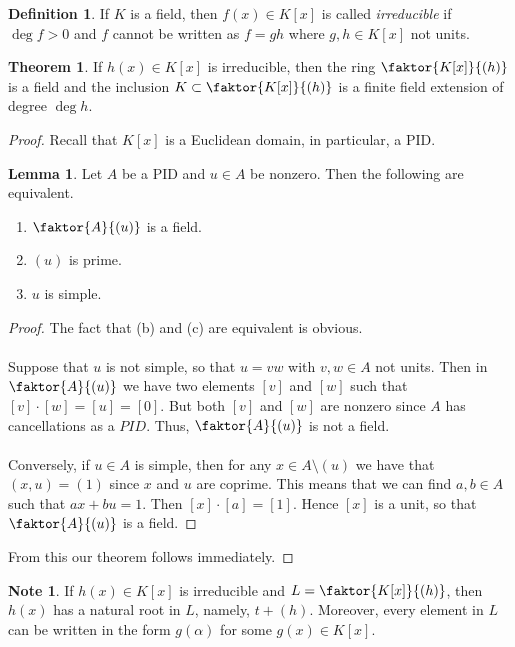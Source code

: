 \documentclass[10pt,letterpaper,cm]{nupset}
\theoremstyle{definition}
\newtheorem*{definition}{Definition}
\newtheorem{note}{Note}
\newtheorem{theorem}{Theorem}
\newtheorem{lemma}{Lemma}
\newcommand{\1}{\mathbf{1}}
\newcommand{\0}{\vec 0}
\begin{document}
\begin{definition}
If $K$ is a field, then $f(x) \in K[x]$ is called \textit{irreducible} if $\deg{f}>0$ and $f$ cannot be written as $f=gh$ where $g,h\in K[x]$ not units. 
\end{definition}

\begin{theorem}
If $h(x) \in K[x]$ is irreducible, then the ring $\faktor{K[x]}{(h)}$ is a field and the inclusion $K \subset \faktor{K[x]}{(h)}$ is a finite field extension of degree $\deg{h}$.
\end{theorem}
\begin{proof}
Recall that $K[x]$ is a Euclidean domain, in particular, a PID.
\begin{lemma}
Let $A$ be a PID and $u\in A$ be nonzero. Then the following are equivalent.
\begin{enumerate}[label=(\alph*)]
\item $\faktor{A}{(u)}$ is a field.
\item $(u)$ is prime.
\item$u$ is simple.
\end{enumerate}
\end{lemma}
\begin{proof}
The fact that (b) and (c) are equivalent is obvious. 
\\ \\ Suppose that $u$ is not simple, so that $u= vw$ with $v,w \in A$ not units. Then in $\faktor{A}{(u)}$ we have two elements $[v]$ and $[w]$ such that $[v]\cdot [w] = [u] = [0]$. But both $[v]$ and $[w]$ are nonzero since $A$ has cancellations as a $PID$. Thus, $\faktor{A}{(u)}$ is not a field.
\\ \\ Conversely, if $u\in A$ is simple, then for any $x\in A\setminus (u)$ we have that $(x,u) = (1)$ since $x$ and $u$ are coprime. This means that we can find $a,b\in A$ such that $ax + bu =1$. Then $[x]\cdot[a] = [1]$. Hence $[x]$ is a unit, so that $\faktor{A}{(u)}$ is a field. 
\end{proof}$ $From this our theorem follows immediately. 
\end{proof}

\begin{note}
If $h(x) \in K[x]$ is irreducible  and $L = \faktor{K[x]}{(h)}$, then $h(x)$ has a natural root in $L$, namely, $t + (h)$. Moreover, every element in $L$ can be written in the form $g(\alpha)$ for some $g(x) \in K[x]$.
\end{note}
\end{document}
